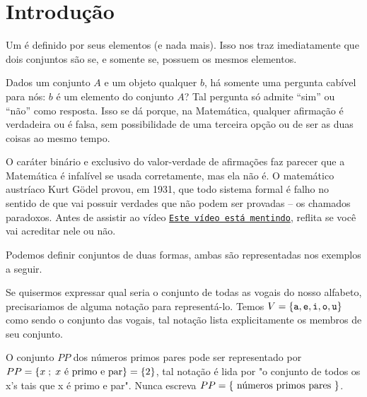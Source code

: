 \section{Introdução}
\label{sec:intro}

Um  é definido por seus elementos (e nada mais). Isso nos traz imediatamente que dois conjuntos são  se, e somente se, possuem os mesmos elementos.

Dados um conjunto $A$ e um objeto qualquer $b$, há somente uma pergunta cabível para nós: $b$ é um elemento do conjunto $A$? Tal pergunta só admite ``sim'' ou ``não'' como resposta. Isso se dá porque, na Matemática, qualquer afirmação é verdadeira ou é falsa, sem possibilidade de uma terceira opção ou de ser as duas coisas ao mesmo tempo. 

O caráter binário e exclusivo do valor-verdade de afirmações faz parecer que a Matemática é infalível se usada corretamente, mas ela não é. O matemático austríaco Kurt Gödel provou, em 1931, que todo sistema formal é falho no sentido de que vai possuir verdades que não podem ser provadas -- os chamados paradoxos. Antes de assistir ao vídeo \href{https://youtu.be/UI1xR_AECrU}{{\tt Este vídeo está mentindo}}, reflita se você vai acreditar nele ou não.

\begin{remark}
Podemos definir conjuntos de duas formas, ambas são representadas nos exemplos a seguir.
\end{remark}

\begin{example}
\label{ex-vogais}
Se quisermos expressar qual seria o conjunto de todas as vogais do nosso alfabeto, precisariamos de alguma notação para representá-lo. 
Temos $V=\left\{ \texttt{a}, \texttt{e}, \texttt{i}, \texttt{o}, \texttt{u}\right\}$ como sendo o conjunto das vogais, tal notação lista explicitamente os membros de seu conjunto.
\end{example}

\begin{example}
\label{ex-primos-pares}
O conjunto $PP$ dos números primos pares pode ser representado por $PP = \left\{ x \;;\; x \text{ é primo e par}\right\} = \left\{ 2\right\}$, tal notação é lida por "o conjunto de todos os x's tais que x é primo e par". Nunca escreva $PP = \left\{ \text{ números primos pares }\right\}$.
\end{example}

%
